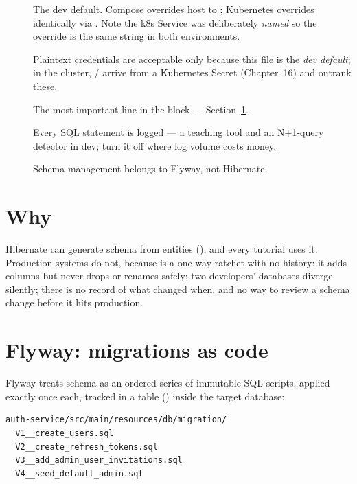 \begin{description}
  \item[] The dev default. Compose overrides host to
  ; Kubernetes overrides identically via
  . Note the k8s Service was deliberately
  \emph{named}  so the override is the same string
  in both environments.
  \item[] Plaintext credentials are acceptable only because this
  file is the \emph{dev default}; in the cluster,
  / arrive from a
  Kubernetes Secret (Chapter~16) and outrank these.
  \item[] The most important line in the block ---
  Section~\ref{sec:ddlauto}.
  \item[] Every SQL statement is logged --- a teaching tool and an
  N+1-query detector in dev; turn it off where log volume costs money.
  \item[] Schema management belongs to Flyway, not Hibernate.
\end{description}

\section{Why }
\label{sec:ddlauto}

Hibernate can generate schema from entities (),
and every tutorial uses it. Production systems do not, because
 is a one-way ratchet with no history: it adds columns but
never drops or renames safely; two developers' databases diverge
silently; there is no record of what changed when, and no way to review a
schema change before it hits production.

\section{Flyway: migrations as code}

Flyway treats schema as an ordered series of immutable SQL scripts,
applied exactly once each, tracked in a table
() inside the target database:

\begin{lstlisting}
auth-service/src/main/resources/db/migration/
  V1__create_users.sql
  V2__create_refresh_tokens.sql
  V3__add_admin_user_invitations.sql
  V4__seed_default_admin.sql
\end{lstlisting}

